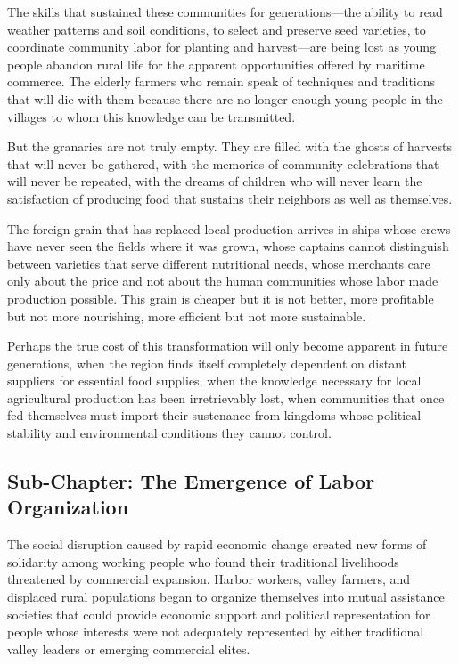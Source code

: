The skills that sustained these communities for generations---the
ability to read weather patterns and soil conditions, to select and
preserve seed varieties, to coordinate community labor for planting and
harvest---are being lost as young people abandon rural life for the
apparent opportunities offered by maritime commerce. The elderly farmers
who remain speak of techniques and traditions that will die with them
because there are no longer enough young people in the villages to whom
this knowledge can be transmitted.

But the granaries are not truly empty. They are filled with the ghosts
of harvests that will never be gathered, with the memories of community
celebrations that will never be repeated, with the dreams of children
who will never learn the satisfaction of producing food that sustains
their neighbors as well as themselves.

The foreign grain that has replaced local production arrives in ships
whose crews have never seen the fields where it was grown, whose
captains cannot distinguish between varieties that serve different
nutritional needs, whose merchants care only about the price and not
about the human communities whose labor made production possible. This
grain is cheaper but it is not better, more profitable but not more
nourishing, more efficient but not more sustainable.

Perhaps the true cost of this transformation will only become apparent
in future generations, when the region finds itself completely dependent
on distant suppliers for essential food supplies, when the knowledge
necessary for local agricultural production has been irretrievably lost,
when communities that once fed themselves must import their sustenance
from kingdoms whose political stability and environmental conditions
they cannot control.

\subsection{Sub-Chapter: The Emergence of Labor
Organization}\label{sub-chapter-the-emergence-of-labor-organization}

The social disruption caused by rapid economic change created new forms
of solidarity among working people who found their traditional
livelihoods threatened by commercial expansion. Harbor workers, valley
farmers, and displaced rural populations began to organize themselves
into mutual assistance societies that could provide economic support and
political representation for people whose interests were not adequately
represented by either traditional valley leaders or emerging commercial
elites.

